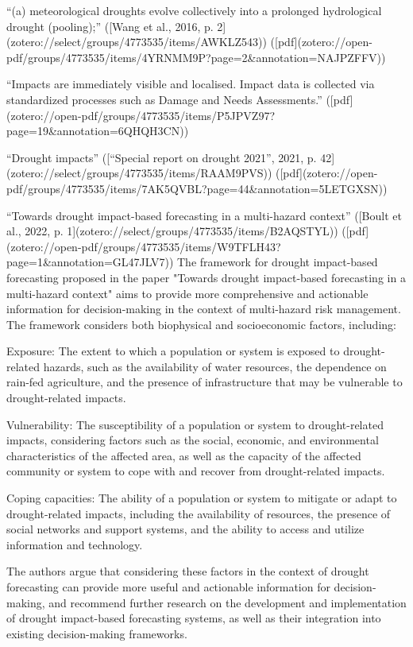 {%
“(a) meteorological droughts evolve collectively into a prolonged hydrological drought (pooling);” ([Wang et al., 2016, p. 2](zotero://select/groups/4773535/items/AWKLZ543)) ([pdf](zotero://open-pdf/groups/4773535/items/4YRNMM9P?page=2&annotation=NAJPZFFV))


“Impacts are immediately visible and localised. Impact data is collected via standardized processes such as Damage and Needs Assessments.” ([pdf](zotero://open-pdf/groups/4773535/items/P5JPVZ97?page=19&annotation=6QHQH3CN))

“Drought impacts” ([“Special report on drought 2021”, 2021, p. 42](zotero://select/groups/4773535/items/RAAM9PVS)) ([pdf](zotero://open-pdf/groups/4773535/items/7AK5QVBL?page=44&annotation=5LETGXSN))


“Towards drought impact-based forecasting in a multi-hazard context” ([Boult et al., 2022, p. 1](zotero://select/groups/4773535/items/B2AQSTYL)) ([pdf](zotero://open-pdf/groups/4773535/items/W9TFLH43?page=1&annotation=GL47JLV7))
The framework for drought impact-based forecasting proposed in the paper "Towards drought impact-based forecasting in a multi-hazard context" aims to provide more comprehensive and actionable information for decision-making in the context of multi-hazard risk management. The framework considers both biophysical and socioeconomic factors, including:

Exposure: The extent to which a population or system is exposed to drought-related hazards, such as the availability of water resources, the dependence on rain-fed agriculture, and the presence of infrastructure that may be vulnerable to drought-related impacts.

Vulnerability: The susceptibility of a population or system to drought-related impacts, considering factors such as the social, economic, and environmental characteristics of the affected area, as well as the capacity of the affected community or system to cope with and recover from drought-related impacts.

Coping capacities: The ability of a population or system to mitigate or adapt to drought-related impacts, including the availability of resources, the presence of social networks and support systems, and the ability to access and utilize information and technology.

The authors argue that considering these factors in the context of drought forecasting can provide more useful and actionable information for decision-making, and recommend further research on the development and implementation of drought impact-based forecasting systems, as well as their integration into existing decision-making frameworks.


}
